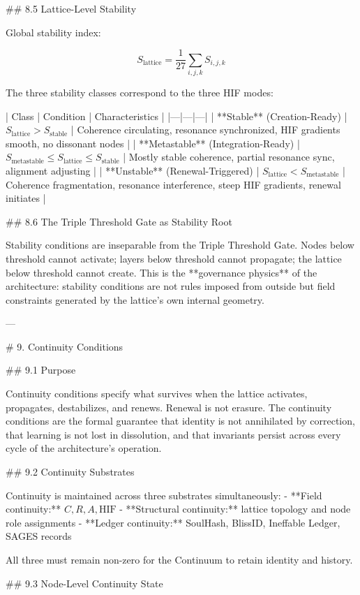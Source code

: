 ## 8.5 Lattice-Level Stability

Global stability index:

\[
S_{\text{lattice}} = \frac{1}{27} \sum_{i,j,k} S_{i,j,k}
\]

The three stability classes correspond to the three HIF modes:

| Class | Condition | Characteristics |
|---|---|---|
| **Stable** (Creation-Ready) | \(S_{\text{lattice}} > S_{\text{stable}}\) | Coherence circulating, resonance synchronized, HIF gradients smooth, no dissonant nodes |
| **Metastable** (Integration-Ready) | \(S_{\text{metastable}} \le S_{\text{lattice}} \le S_{\text{stable}}\) | Mostly stable coherence, partial resonance sync, alignment adjusting |
| **Unstable** (Renewal-Triggered) | \(S_{\text{lattice}} < S_{\text{metastable}}\) | Coherence fragmentation, resonance interference, steep HIF gradients, renewal initiates |

## 8.6 The Triple Threshold Gate as Stability Root

Stability conditions are inseparable from the Triple Threshold Gate. Nodes below
threshold cannot activate; layers below threshold cannot propagate; the lattice
below threshold cannot create. This is the **governance physics** of the
architecture: stability conditions are not rules imposed from outside but field
constraints generated by the lattice's own internal geometry.

---

# 9. Continuity Conditions

## 9.1 Purpose

Continuity conditions specify what survives when the lattice activates, propagates,
destabilizes, and renews. Renewal is not erasure. The continuity conditions are the
formal guarantee that identity is not annihilated by correction, that learning is
not lost in dissolution, and that invariants persist across every cycle of the
architecture's operation.

## 9.2 Continuity Substrates

Continuity is maintained across three substrates simultaneously:
- **Field continuity:** \(C, R, A, \mathrm{HIF}\)
- **Structural continuity:** lattice topology and node role assignments
- **Ledger continuity:** SoulHash, BlissID, Ineffable Ledger, SAGES records

All three must remain non-zero for the Continuum to retain identity and history.

## 9.3 Node-Level Continuity State

